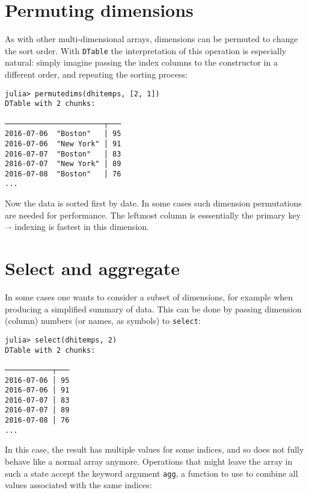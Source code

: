 \documentclass{memoir}
\begin{document}
\hypertarget{10652689425744280248}{}


\section{Permuting dimensions}



As with other multi-dimensional arrays, dimensions can be permuted to change the sort order. With \texttt{DTable} the interpretation of this operation is especially natural: simply imagine passing the index columns to the constructor in a different order, and repeating the sorting process:




\begin{verbatim}
julia> permutedims(dhitemps, [2, 1])
DTable with 2 chunks:

───────────────────────┬───
2016-07-06  "Boston"   │ 95
2016-07-06  "New York" │ 91
2016-07-07  "Boston"   │ 83
2016-07-07  "New York" │ 89
2016-07-08  "Boston"   │ 76
...
\end{verbatim}



Now the data is sorted first by date. In some cases such dimension permutations are needed for performance. The leftmost column is esssentially the primary key –- indexing is fastest in this dimension.



\hypertarget{8969345596108613746}{}


\section{Select and aggregate}



In some cases one wants to consider a subset of dimensions, for example when producing a simplified summary of data. This can be done by passing dimension (column) numbers (or names, as symbols) to \texttt{select}:




\begin{verbatim}
julia> select(dhitemps, 2)
DTable with 2 chunks:

───────────┬───
2016-07-06 │ 95
2016-07-06 │ 91
2016-07-07 │ 83
2016-07-07 │ 89
2016-07-08 │ 76
...
\end{verbatim}



In this case, the result has multiple values for some indices, and so does not fully behave like a normal array anymore. Operations that might leave the array in such a state accept the keyword argument \texttt{agg}, a function to use to combine all values associated with the same indices:
\end{document}
